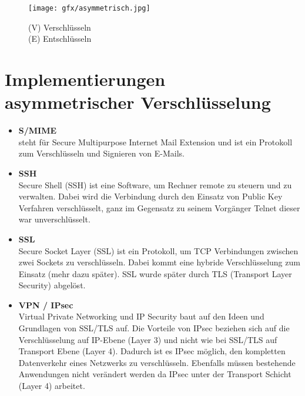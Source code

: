 \begin{figure}[ht]
	\centering
  \texttt{[image: gfx/asymmetrisch.jpg]}
	\caption{(V) Verschlüsseln\\(E) Entschlüsseln}
\end{figure}
\newpage

\section{Implementierungen asymmetrischer Verschlüsselung}

\begin{itemize}
    \item \textbf{S/MIME}\\steht für Secure Multipurpose Internet Mail Extension und ist ein Protokoll zum Verschlüsseln und Signieren von E-Mails.\citep{ERTEL:2020}
    \item \textbf{SSH}\\Secure Shell (SSH) ist eine Software, um Rechner remote zu steuern und zu verwalten. Dabei wird die Verbindung durch den Einsatz von Public Key Verfahren verschlüsselt, ganz im Gegensatz zu seinem Vorgänger Telnet dieser war unverschlüsselt.\citep{ERTEL:2020}
    \item \textbf{SSL}\\ Secure Socket Layer (SSL) ist ein Protokoll, um TCP Verbindungen zwischen zwei Sockets zu verschlüsseln. 
    Dabei kommt eine hybride Verschlüsselung zum Einsatz (mehr dazu später). SSL wurde später durch TLS (Transport Layer Security) abgelöst.\citep{ERTEL:2020}
    \item \textbf{VPN / IPsec}\\Virtual Private Networking und IP Security baut auf den Ideen und Grundlagen von SSL/TLS auf.
    Die Vorteile von IPsec beziehen sich auf die Verschlüsselung auf IP-Ebene (Layer 3) und nicht wie bei SSL/TLS auf Transport Ebene (Layer 4).
    Dadurch ist es IPsec möglich, den kompletten Datenverkehr eines Netzwerks zu verschlüsseln. Ebenfalls müssen bestehende Anwendungen nicht verändert werden da IPsec unter der Transport Schicht (Layer 4) arbeitet.\citep{ERTEL:2020}
\end{itemize}